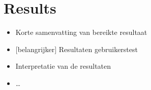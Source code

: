 \chapter{Results}

\begin{itemize}
\item Korte samenvatting van bereikte resultaat
\item $[$belangrijker$]$ Resultaten gebruikerstest
\item Interpretatie van de resultaten
\item \ldots
\end{itemize}